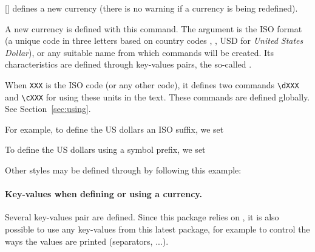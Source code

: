 \documentclass[12pt,add-index]{cnltx-doc}
\begin{document}
\begin{commands}
    [] 
    defines a new currency (there is no warning if a currency is being redefined).
\end{commands}

A new currency is defined  with this command. The argument 
is the ISO format (a unique code in three letters based on country codes \cite{iso,iso:wikipedia}, \eg, USD
for \emph{United States Dollar}), or any suitable name from which commands will be created.
Its characteristics are defined through key-values pairs, the so-called .

When \verb|XXX| is the ISO code (or any other code), it defines 
two commands \verb|\dXXX| and \verb|\cXXX| for using these units in the text.
These commands are defined globally. 
See Section~\ref{sec:using}.


For example, to define the US dollars an ISO suffix, we set

\begin{sourcecode}[add-sourcecode-options={deletedelim=*[s][\color{math}]{$}{$}}]
\end{sourcecode}

To define the US dollars using a symbol prefix, we set

\begin{sourcecode}[add-sourcecode-options={deletedelim=*[s][\color{math}]{$}{$}}]
\end{sourcecode}

Other styles may be defined through  by following this example:
\begin{example}
\end{example}

\paragraph*{Key-values when defining or using a currency.}

Several key-values pair are defined. Since this package relies on ,
it is also possible to use any key-values from this latest package, for example 
to control the ways the values are printed (separators, ...).
\end{document}
